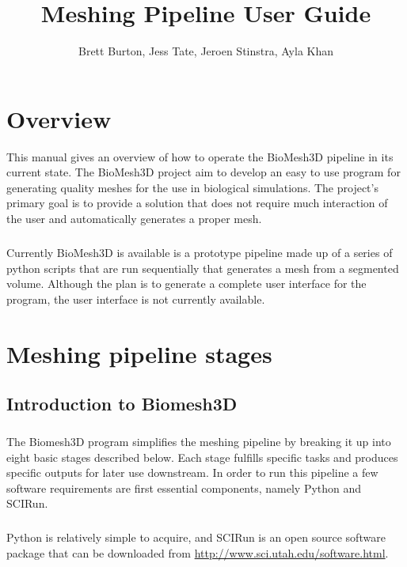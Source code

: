 \documentclass[fleqn,12pt,openany]{book}
\title{Meshing Pipeline User Guide}
\author{Brett Burton, Jess Tate, Jeroen Stinstra, Ayla Khan}
\begin{document}
\maketitle


\chapter{Overview}\label{overview}

This manual gives an overview of how to operate the BioMesh3D pipeline in its
current state. The BioMesh3D project aim to develop an easy to use 
program for generating quality meshes for the use in biological simulations.
The project's primary goal is to provide a solution that does not require much interaction of the
user and automatically generates a proper mesh.
\paragraph{}
Currently BioMesh3D is available is a prototype pipeline made up of a series of python scripts that are run sequentially that generates a mesh from a segmented volume.
Although the plan is to generate a complete user interface for the program, the user interface is not currently available.

\chapter{Meshing pipeline stages}
\label{sec:tetgenflags}

\section{Introduction to Biomesh3D}
\label{sec:flags}

\paragraph{}
The Biomesh3D program simplifies the meshing pipeline by breaking it up into 
eight basic stages described below. Each stage fulfills specific tasks and 
produces specific outputs for later use downstream.  In order to run this 
pipeline a few software requirements are first essential components, 
namely Python and SCIRun.

\paragraph{}
Python is relatively simple to acquire, and SCIRun is 
an open source software package that can be downloaded from 
\url{http://www.sci.utah.edu/software.html}.
\end{document}
